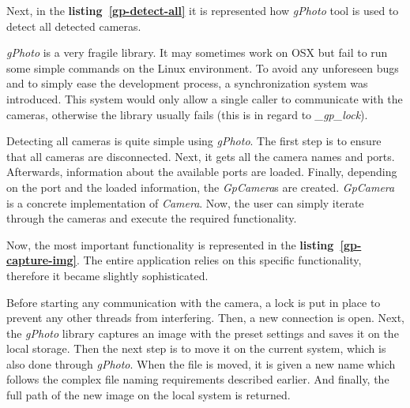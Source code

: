 \vspace{0.3cm}
Next, in the \textbf{\mbox{listing \ref{gp-detect-all}}} it is represented how \textit{gPhoto} tool is used to detect all detected cameras.

\vspace{0.3cm}


\vspace{0.3cm}
\textit{gPhoto} is a very fragile library. It may sometimes work on OSX but fail to run some simple commands on the Linux environment. To avoid any unforeseen bugs and to simply ease the development process, a synchronization system was introduced. This system would only allow a single caller to communicate with the cameras, otherwise the library usually fails (this is in regard to \textit{\_gp\_lock}).

\vspace{0.3cm}
Detecting all cameras is quite simple using \textit{gPhoto}. The first step is to ensure that all cameras are disconnected. Next, it gets all the camera names and ports. Afterwards, information about the available ports are loaded. Finally, depending on the port and the loaded information, the \textit{GpCamera}s are created. \textit{GpCamera} is a concrete implementation of \textit{Camera}. Now, the user can simply iterate through the cameras and execute the required functionality.

\vspace{0.3cm}
Now, the most important functionality is represented in the \textbf{\mbox{listing \ref{gp-capture-img}}}. The entire application relies on this specific functionality, therefore it became slightly sophisticated.



\vspace{0.3cm}
Before starting any communication with the camera, a lock is put in place to prevent any other threads from interfering. Then, a new connection is open. Next, the \textit{gPhoto} library captures an image with the preset settings and saves it on the local storage. Then the next step is to move it on the current system, which is also done through \textit{gPhoto}. When the file is moved, it is given a new name which follows the complex file naming requirements described earlier. And finally, the full path of the new image on the local system is returned.

